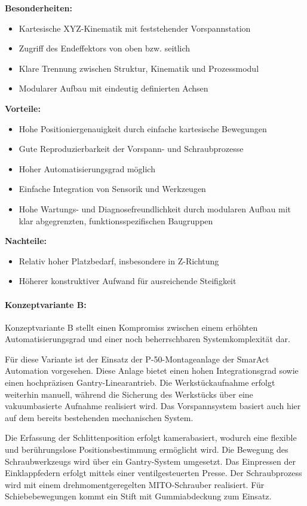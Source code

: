 \textbf{Besonderheiten:}
\begin{itemize}
    \item Kartesische XYZ-Kinematik mit feststehender Vorspannstation
    \item Zugriff des Endeffektors von oben bzw. seitlich
    \item Klare Trennung zwischen Struktur, Kinematik und Prozessmodul
    \item Modularer Aufbau mit eindeutig definierten Achsen
\end{itemize}

\textbf{Vorteile:}
\begin{itemize}
    \item Hohe Positioniergenauigkeit durch einfache kartesische Bewegungen
    \item Gute Reproduzierbarkeit der Vorspann- und Schraubprozesse
    \item Hoher Automatisierungsgrad möglich
    \item Einfache Integration von Sensorik und Werkzeugen
    \item Hohe Wartungs- und Diagnosefreundlichkeit durch modularen Aufbau mit klar abgegrenzten, funktionsspezifischen Baugruppen
\end{itemize}

\textbf{Nachteile:}
\begin{itemize}
    \item Relativ hoher Platzbedarf, insbesondere in Z-Richtung
    \item Höherer konstruktiver Aufwand für ausreichende Steifigkeit
\end{itemize}

\paragraph{Konzeptvariante B:}
Konzeptvariante B stellt einen Kompromiss zwischen einem erhöhten Automatisierungsgrad und einer noch beherrschbaren Systemkomplexität dar.

Für diese Variante ist der Einsatz der P-50-Montageanlage der SmarAct Automation vorgesehen. Diese Anlage bietet einen hohen Integrationsgrad sowie einen hochpräzisen Gantry-Linearantrieb.\cite{SmarActAutomation_P50} Die Werkstückaufnahme erfolgt weiterhin manuell, während die Sicherung des Werkstücks über eine vakuumbasierte Aufnahme realisiert wird. Das Vorspannsystem basiert auch hier auf dem bereits bestehenden mechanischen System.

Die Erfassung der Schlittenposition erfolgt kamerabasiert, wodurch eine flexible und berührungslose Positionsbestimmung ermöglicht wird. Die Bewegung des Schraubwerkzeugs wird über ein Gantry-System umgesetzt. Das Einpressen der Einklappfedern erfolgt mittels einer ventilgesteuerten Presse. Der Schraubprozess wird mit einem drehmomentgeregelten MITO-Schrauber realisiert. Für Schiebebewegungen kommt ein Stift mit Gummiabdeckung zum Einsatz.


